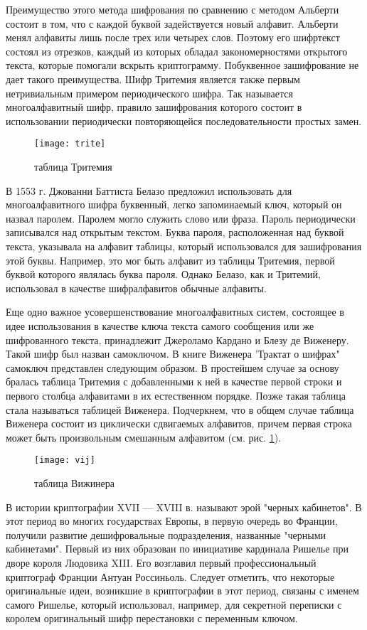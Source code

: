 Преимущество этого метода шифрования по сравнению с методом Альберти состоит в том, что с каждой буквой задействуется новый алфавит. Альберти менял алфавиты лишь по­сле трех или четырех слов. Поэтому его шифртекст состоял из отрезков, каждый из которых обладал закономерностями открытого текста, которые помогали вскрыть криптограмму. Побуквенное зашифрование не дает такого преимущества. Шифр Тритемия является также первым нетривиальным примером периодического шифра. Так называется многоалфавитный шифр, правило зашифрования которого состоит в использовании периодически повторяющейся последовательности простых замен.

\begin{figure}[H]
	\texttt{[image: trite]}
	\centering
	\caption{таблица Тритемия}
\end{figure}



В 1553 г. Джованни Баттиста Белазо предложил использовать для многоалфавитного шифра буквенный, легко запо­минаемый ключ, который он назвал паролем. Паролем могло служить слово или фраза. Пароль периодически записывался над открытым текстом. Буква пароля, расположенная над буквой текста, указывала на алфавит таблицы, который исполь­зовался для зашифрования этой буквы. Например, это мог быть алфавит из таблицы Тритемия, первой буквой которого являлась буква пароля. Однако Белазо, как и Тритемий, использовал в качестве шифралфавитов обычные алфавиты.

Еще одно важное усовершенствование многоалфавитных систем, состоящее в идее использования в качестве ключа текста самого сообщения или же шифрованного текста, при­надлежит Джероламо Кардано и Блезу де Виженеру. Такой шифр был назван самоключом. В книге Виженера 'Трактат о шифрах" самоключ представлен следующим образом. В про­стейшем случае за основу бралась таблица Тритемия с добав­ленными к ней в качестве первой строки и первого столбца алфавитами в их естественном порядке. Позже такая таблица стала называться таблицей Виженера. Подчеркнем, что в общем случае таблица Виженера состоит из циклически сдви­гаемых алфавитов, причем первая строка может быть произ­вольным смешанным алфавитом (см. рис. \ref{tablvij}).

\begin{figure}[H]
	\texttt{[image: vij]}
	\centering
	\caption{таблица Вижинера}
	\label{tablvij}
\end{figure}


В истории криптографии XVII — XVIII в. называют эрой "черных кабинетов". В этот период во многих государствах Европы, в первую очередь во Франции, получили развитие дешифровальные подразделения, названные "черными кабинетами". Первый из них образован по инициативе кардинала Ришелье при дворе короля Людовика XIII. Его возглавил первый профессиональный криптограф Франции Антуан Россиньоль. Следует отметить, что некоторые оригинальные идеи, возникшие в криптографии в этот период, связаны с именем самого Ришелье, который использовал, например, для секретной переписки с королем оригинальный шифр перестановки с переменным ключом.

